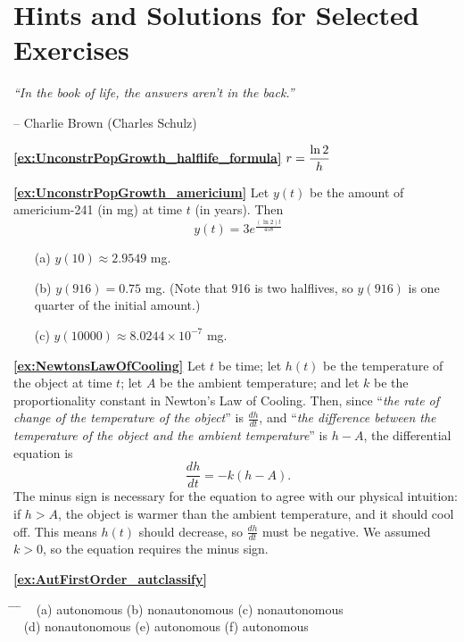%
\chapter[Hints and Solutions]{Hints and Solutions for Selected Exercises}

\noindent
\emph{``In the book of life, the answers aren't in the back.''}

\hfill        -- Charlie Brown (Charles Schulz)

\bigskip
\textbf{\ref{ex:UnconstrPopGrowth_halflife_formula}} $\displaystyle r = \frac{\ln 2}{h}$

\medskip
\textbf{\ref{ex:UnconstrPopGrowth_americium}}
Let $y(t)$ be the amount of americium-241
(in mg) at time $t$ (in years). Then
\[
   y(t) = 3e^{\frac{(\ln 2)t}{458}}
\]
\begin{enumerate}
\item[(a)] $y(10) \approx 2.9549$ mg.
\item[(b)] $y(916) = 0.75$ mg. (Note that 916 is two halflives, so $y(916)$
is one quarter of the initial amount.)
\item[(c)] $y(10000) \approx 8.0244\times 10^{-7}$ mg.
\end{enumerate}

\medskip
\textbf{\ref{ex:NewtonsLawOfCooling}}
Let $t$ be time;
let $h(t)$ be the temperature of the object
at time $t$;
let $A$ be the ambient temperature;
and let $k$ be the proportionality constant in
Newton's Law of Cooling.
Then, since ``\emph{the rate of change of the temperature of the
object}'' is $\frac{dh}{dt}$, and ``\emph{the difference
between the temperature of the object and the ambient
temperature}'' is $h-A$, the differential equation is
\[
   \frac{dh}{dt} = - k (h-A).
\]
The minus sign is necessary for the equation to agree with
our physical intuition: if $h>A$, the object is warmer than the ambient
temperature, and it should cool off. This means $h(t)$ should
decrease, so $\frac{dh}{dt}$ must be negative.  We assumed
$k>0$, so the equation requires the minus sign.


\medskip
\textbf{\ref{ex:AutFirstOrder_autclassify}}
\begin{tabbing}
\hspace*{0.25in} \= \hspace*{1.5in} \= \hspace*{1.5in} \= \kill
~ \> 
(a) autonomous \>
(b) nonautonomous \>
(c) nonautonomous \\[2pt]
~ \>
(d) nonautonomous \>
(e) autonomous \>
(f) autonomous
\end{tabbing}

